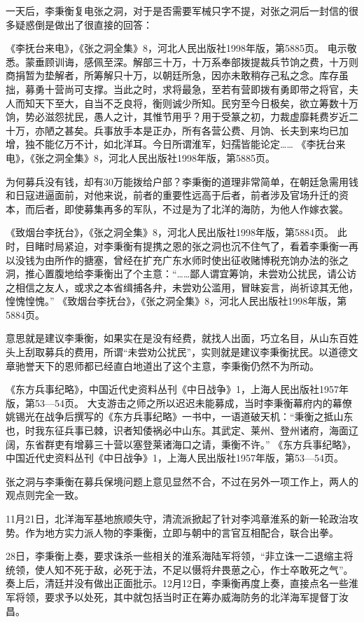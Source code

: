 \documentclass[12pt,UTF8]{ctexbook}
\begin{document}
一天后，李秉衡复电张之洞，对于是否需要军械只字不提，对张之洞后一封信的很多疑惑倒是做出了很直接的回答：

《李抚台来电》，《张之洞全集》8，河北人民出版社1998年版，第5885页。
电示敬悉。蒙垂顾训诲，感佩至深。解部三十万，十万系奉部拨提裁兵节饷之费，十万则商捐暂为垫解者，所筹解只十万，以朝廷所急，因亦未敢稍存己私之念。库存虽拙，募勇十营尚可支撑。当此之时，求将最急，至若有营即拨有勇即带之将官，夫人而知天下至大，自当不乏良将，衡则诚少所知。民穷至今日极矣，欲立筹数十万饷，势必滋怨扰民，愚人之计，其惟节用乎？用于受篆之初，力裁虚靡耗费岁近二十万，亦陋之甚矣。兵事放手本是正办，所有各营公费、月饷、长夫到来均已加增，独不能亿万不计，如北洋耳。今日所谓淮军，妇孺皆能论定…… 《李抚台来电》，《张之洞全集》8，河北人民出版社1998年版，第5885页。

为何募兵没有钱，却有30万能拨给户部？李秉衡的道理非常简单，在朝廷急需用钱和日寇进逼面前，对他来说，前者的重要性远高于后者，前者涉及官场升迁的资本，而后者，即使募集再多的军队，不过是为了北洋的海防，为他人作嫁衣裳。

《致烟台李抚台》，《张之洞全集》8，河北人民出版社1998年版，第5884页。
此时，目睹时局紧迫，对李秉衡有提携之恩的张之洞也沉不住气了，看着李秉衡一再以没钱为由所作的搪塞，曾经在扩充广东水师时使出征收赌博税充饷办法的张之洞，推心置腹地给李秉衡出了个主意：“……鄙人谓宜筹饷，未尝劝公扰民，请公访之相信之友人，或求之本省缉捕各弁，未尝劝公滥用，冒昧妄言，尚祈谅其无他，惶愧惶愧。” 《致烟台李抚台》，《张之洞全集》8，河北人民出版社1998年版，第5884页。

意思就是建议李秉衡，如果实在是没有经费，就找人出面，巧立名目，从山东百姓头上刮取募兵的费用，所谓“未尝劝公扰民”，实则就是建议李秉衡扰民。以道德文章驰誉天下的恩师都已经直白地道出了这个主意，李秉衡仍然不为所动。

《东方兵事纪略》，中国近代史资料丛刊《中日战争》1，上海人民出版社1957年版，第53—54页。
大支游击之师之所以迟迟未能募成，当时李秉衡幕府内的幕僚姚锡光在战争后撰写的《东方兵事纪略》一书中，一语道破天机：“秉衡之抵山东也，时我东征兵事已棘，识者知倭祸必中山东。其武定、莱州、登州诸府，海面辽阔，东省群吏有增募三十营以塞登莱诸海口之请，秉衡不许。” 《东方兵事纪略》，中国近代史资料丛刊《中日战争》1，上海人民出版社1957年版，第53—54页。

张之洞与李秉衡在募兵保境问题上意见显然不合，不过在另外一项工作上，两人的观点则完全一致。

11月21日，北洋海军基地旅顺失守，清流派掀起了针对李鸿章淮系的新一轮政治攻势。作为地方实力派人物的李秉衡，立即与朝中的言官互相配合，联合出拳。

28日，李秉衡上奏，要求诛杀一些相关的淮系海陆军将领，“非立诛一二退缩主将统领，使人知不死于敌，必死于法，不足以慑将弁畏葸之心，作士卒敢死之气”。奏上后，清廷并没有做出正面批示。12月12日，李秉衡再度上奏，直接点名一些淮军将领，要求予以处死，其中就包括当时正在筹办威海防务的北洋海军提督丁汝昌。
\end{document}
